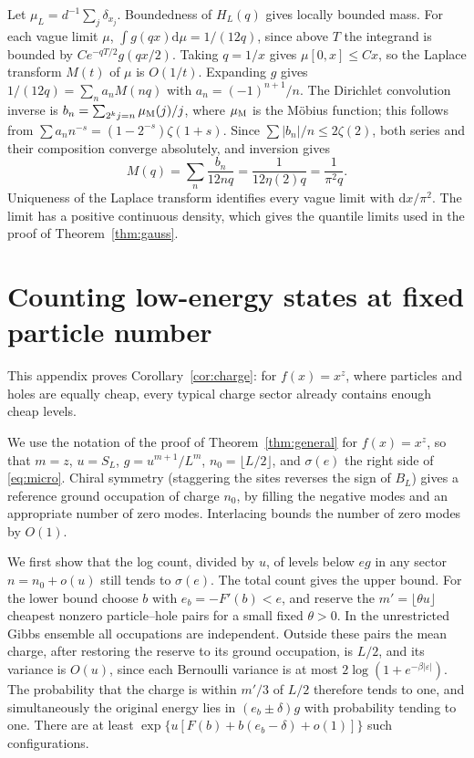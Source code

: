 \documentclass[11pt,a4paper]{article}
\theoremstyle{remark}
\newcommand{\dd}{\mathrm d}
\begin{document}
Let $\mu_L=d^{-1}\sum_j\delta_{x_j}$. Boundedness of $H_L(q)$ gives locally bounded mass. For each vague limit $\mu$,
$\int g(qx)\dd\mu=1/(12q)$, since above $T$ the integrand is bounded by $C e^{-qT/2}g(qx/2)$. Taking $q=1/x$ gives $\mu[0,x]\le Cx$, so the Laplace transform $M(t)$ of $\mu$ is $O(1/t)$. Expanding $g$ gives $1/(12q)=\sum_n a_nM(nq)$ with $a_n=(-1)^{n+1}/n$. The Dirichlet convolution inverse is $b_n=\sum_{2^k j=n}\mu_{\rm M}(j)/j$, where $\mu_{\rm M}$ is the M\"obius function; this follows from $\sum a_n n^{-s}=(1-2^{-s})\zeta(1+s)$. Since $\sum |b_n|/n\le2\zeta(2)$, both series and their composition converge absolutely, and inversion gives
\[
 M(q)=\sum_n \frac{b_n}{12nq}=\frac{1}{12\eta(2)q}=\frac{1}{\pi^2 q}.
\]
Uniqueness of the Laplace transform identifies every vague limit with $\dd x/\pi^2$. The limit has a positive continuous density, which gives the quantile limits used in the proof of Theorem~\ref{thm:gauss}.

\section{Counting low-energy states at fixed particle number}\label{app:charge}
This appendix proves Corollary~\ref{cor:charge}: for $f(x)=x^z$, where particles and holes are equally cheap, every typical charge sector already contains enough cheap levels.

We use the notation of the proof of Theorem~\ref{thm:general} for $f(x)=x^z$, so that $m=z$, $u=S_L$, $g=u^{m+1}/L^m$, $n_0=\lfloor L/2\rfloor$, and $\sigma(e)$ the right side of \eqref{eq:micro}. Chiral symmetry (staggering the sites reverses the sign of $B_L$) gives a reference ground occupation of charge $n_0$, by filling the negative modes and an appropriate number of zero modes. Interlacing bounds the number of zero modes by $O(1)$.

We first show that the log count, divided by $u$, of levels below $eg$ in any sector $n=n_0+o(u)$ still tends to $\sigma(e)$. The total count gives the upper bound. For the lower bound choose $b$ with $e_b=-F'(b)<e$, and reserve the $m'=\lfloor\theta u\rfloor$ cheapest nonzero particle--hole pairs for a small fixed $\theta>0$. In the unrestricted Gibbs ensemble all occupations are independent. Outside these pairs the mean charge, after restoring the reserve to its ground occupation, is $L/2$, and its variance is $O(u)$, since each Bernoulli variance is at most $2\log(1+e^{-\beta |\varepsilon|})$. The probability that the charge is within $m'/3$ of $L/2$ therefore tends to one, and simultaneously the original energy lies in $(e_b\pm\delta)g$ with probability tending to one. There are at least $\exp\{u[F(b)+b(e_b-\delta)+o(1)]\}$ such configurations.
\end{document}
